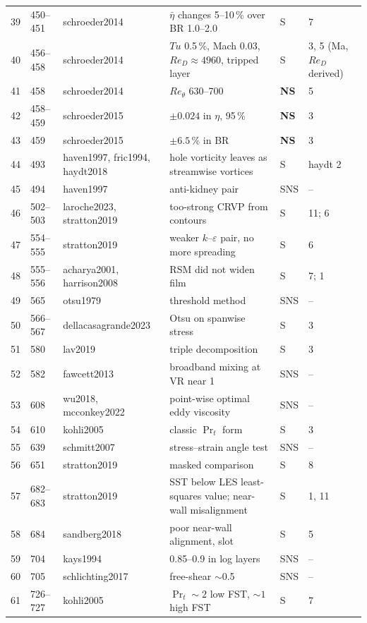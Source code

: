 \documentclass[10pt,a4paper]{article}
\newcommand*{\Reth}{\mathit{Re}_\theta}
\newcommand*{\ReD}{\mathit{Re}_D}
\newcommand*{\etab}{\bar\eta}
\newcommand{\vS}{\textsf{S}}
\newcommand{\vNS}{\textbf{\textsf{NS}}}
\newcommand{\vSNS}{\textsf{SNS}}
\begin{document}
{\begin{longtable}{@{}r P{11mm} P{36mm} P{70mm} P{12mm} P{18mm}@{}}
39 & 450--451 & schroeder2014 & $\etab$ changes 5--10\,\% over BR 1.0--2.0 & \vS & 7 \\
40 & 456--458 & schroeder2014 & $Tu$ 0.5\,\%, Mach 0.03, $\ReD\approx4960$, tripped layer & \vS & 3, 5 (Ma, $\ReD$ derived) \\
41 & 458 & schroeder2014 & $\Reth$ 630--700 & \vNS & 5 \\
42 & 458--459 & schroeder2015 & $\pm0.024$ in $\eta$, 95\,\% & \vNS & 3 \\
43 & 459 & schroeder2015 & $\pm6.5$\,\% in BR & \vNS & 3 \\
44 & 493 & haven1997, fric1994, haydt2018 & hole vorticity leaves as streamwise vortices & \vS & haydt 2 \\
45 & 494 & haven1997 & anti-kidney pair & \vSNS & -- \\
46 & 502--503 & laroche2023, stratton2019 & too-strong CRVP from contours & \vS & 11; 6 \\
47 & 554--555 & stratton2019 & weaker $k$--$\varepsilon$ pair, no more spreading & \vS & 6 \\
48 & 555--556 & acharya2001, harrison2008 & RSM did not widen film & \vS & 7; 1 \\
49 & 565 & otsu1979 & threshold method & \vSNS & -- \\
50 & 566--567 & dellacasagrande2023 & Otsu on spanwise stress & \vS & 3 \\
51 & 580 & lav2019 & triple decomposition & \vS & 3 \\
52 & 582 & fawcett2013 & broadband mixing at VR near 1 & \vSNS & -- \\
53 & 608 & wu2018, mcconkey2022 & point-wise optimal eddy viscosity & \vSNS & -- \\
54 & 610 & kohli2005 & classic $\Pr_t$ form & \vS & 3 \\
55 & 639 & schmitt2007 & stress--strain angle test & \vSNS & -- \\
56 & 651 & stratton2019 & masked comparison & \vS & 8 \\
57 & 682--683 & stratton2019 & SST below LES least-squares value; near-wall misalignment & \vS & 1, 11 \\
58 & 684 & sandberg2018 & poor near-wall alignment, slot & \vS & 5 \\
59 & 704 & kays1994 & 0.85--0.9 in log layers & \vSNS & -- \\
60 & 705 & schlichting2017 & free-shear $\sim$0.5 & \vSNS & -- \\
61 & 726--727 & kohli2005 & $\Pr_t\sim2$ low FST, $\sim1$ high FST & \vS & 7 \\

\end{longtable}}
\end{document}
